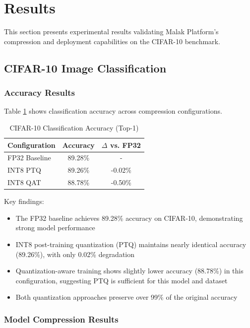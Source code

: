 \section{Results}

This section presents experimental results validating Malak Platform's compression and deployment capabilities on the CIFAR-10 benchmark.

\subsection{CIFAR-10 Image Classification}

\subsubsection{Accuracy Results}

Table \ref{tab:cifar_accuracy} shows classification accuracy across compression configurations.

\begin{table}[h]
\centering
\caption{CIFAR-10 Classification Accuracy (Top-1)}
\label{tab:cifar_accuracy}
\begin{tabular}{lcc}
\hline
\textbf{Configuration} & \textbf{Accuracy} & \textbf{$\Delta$ vs. FP32} \\
\hline
FP32 Baseline & 89.28\% & - \\
INT8 PTQ & 89.26\% & -0.02\% \\
INT8 QAT & 88.78\% & -0.50\% \\
\hline
\end{tabular}
\end{table}

Key findings:
\begin{itemize}
\item The FP32 baseline achieves 89.28\% accuracy on CIFAR-10, demonstrating strong model performance
\item INT8 post-training quantization (PTQ) maintains nearly identical accuracy (89.26\%), with only 0.02\% degradation
\item Quantization-aware training shows slightly lower accuracy (88.78\%) in this configuration, suggesting PTQ is sufficient for this model and dataset
\item Both quantization approaches preserve over 99\% of the original accuracy
\end{itemize}

\subsubsection{Model Compression Results}

